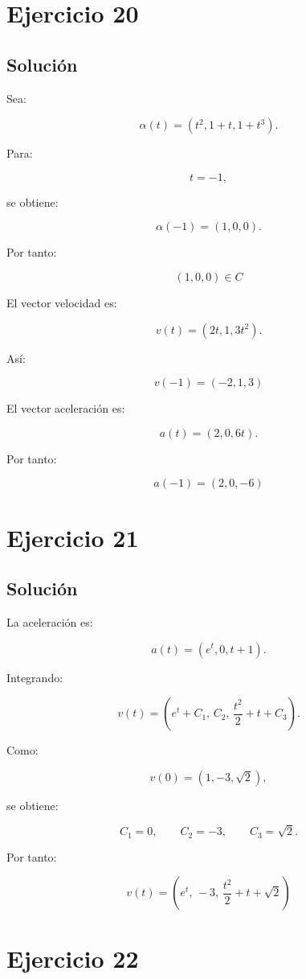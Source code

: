 \documentclass[11pt,a4paper]{article}
\begin{document}
\section{Ejercicio 20}
\subsection{Solución}

Sea:

\[
\alpha(t)
=
(t^2,1+t,1+t^3).
\]

Para:

\[
t=-1,
\]

se obtiene:

\[
\alpha(-1)
=
(1,0,0).
\]

Por tanto:

\[
\boxed{
(1,0,0)\in C
}
\]

El vector velocidad es:

\[
v(t)
=
(2t,1,3t^2).
\]

Así:

\[
\boxed{
v(-1)=(-2,1,3)
}
\]

El vector aceleración es:

\[
a(t)
=
(2,0,6t).
\]

Por tanto:

\[
\boxed{
a(-1)=(2,0,-6)
}
\]

\section{Ejercicio 21}
\subsection{Solución}

La aceleración es:

\[
a(t)
=
(e^t,0,t+1).
\]

Integrando:

\[
v(t)
=
\left(
e^t+C_1,\,
C_2,\,
\frac{t^2}{2}+t+C_3
\right).
\]

Como:

\[
v(0)
=
(1,-3,\sqrt2),
\]

se obtiene:

\[
C_1=0,
\qquad
C_2=-3,
\qquad
C_3=\sqrt2.
\]

Por tanto:

\[
\boxed{
v(t)
=
\left(
e^t,\,
-3,\,
\frac{t^2}{2}+t+\sqrt2
\right)
}
\]

\section{Ejercicio 22}
\end{document}
